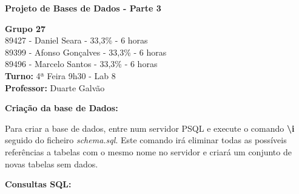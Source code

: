 \documentclass[12pt]{report}
\begin{document}
    \begin{titlepage}
        \begin{center}

            \vspace*{\fill}
            \Huge
            \textbf{Projeto de Bases de Dados - Parte 3}
            
            \vspace*{\fill}

            \Large
            \textbf{Grupo 27} \\
            89427 - Daniel Seara - 33,3\% - 6 horas \\
            89399 - Afonso Gonçalves - 33,3\% - 6 horas \\
            89496 - Marcelo Santos - 33,3\% - 6 horas \\

            \bigskip
            \textbf{Turno:} 4ª Feira 9h30 - Lab 8\\ \textbf{Professor:} Duarte Galvão
        
        \end{center}
    \end{titlepage}

    \Large
    \textbf{Criação da base de Dados:}\\
    
    \normalsize
    \vspace{2mm}

    Para criar a base de dados, entre num servidor PSQL e execute o comando \textbf{\textbackslash{i}} seguido do ficheiro \textit{schema.sql}.
    Este comando irá eliminar todas as possíveis referências a tabelas com o mesmo nome no servidor e criará um conjunto de novas tabelas sem dados.

    \vspace*{15mm}


    \Large 
    \textbf{Consultas SQL:}

    \normalsize
    \vspace{2mm}
\end{document}
